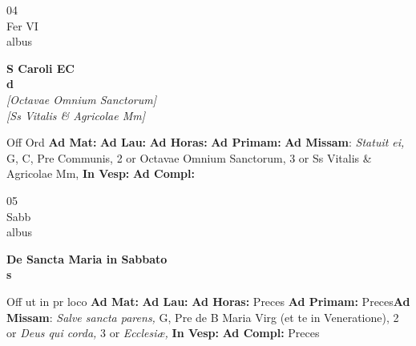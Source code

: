 \documentclass[10pt, openany]{book}
\begin{document}
    \begin{center}
        \begin{minipage}{3.5in}
            \vspace{2em}
            \begin{minipage}{0.5in}
                {\Huge 04} \\
                {\normalsize Fer VI} \\
                {\normalsize albus}
            \end{minipage}
            \begin{minipage}{3.0in}
                \textbf{ \large S Caroli EC \\
                \textnormal{\normalsize d}} \\ \textit{[Octavae Omnium Sanctorum]} \\ \textit{[Ss Vitalis \& Agricolae Mm]} \\ 
            \end{minipage}
            \begin{justify}Off Ord
                \textbf{Ad Mat: }
                \textbf{Ad Lau: }
                \textbf{Ad Horas: }
                \textbf{Ad Primam: }\textbf{Ad Missam}: \textit{Statuit ei,} G, C, Pre Communis, 2 or Octavae Omnium Sanctorum, 3 or Ss Vitalis \& Agricolae Mm,  
                \textbf{In Vesp: }
                \textbf{Ad Compl: }
            \end{justify}
        \end{minipage}
    \end{center}

    \begin{center}
        \begin{minipage}{3.5in}
            \vspace{2em}
            \begin{minipage}{0.5in}
                {\Huge 05} \\
                {\normalsize Sabb} \\
                {\normalsize albus}
            \end{minipage}
            \begin{minipage}{3.0in}
                \textbf{ \large De Sancta Maria in Sabbato \\
                \textnormal{\normalsize s}} \\ 
            \end{minipage}
            \begin{justify}Off ut in pr loco
                \textbf{Ad Mat: }
                \textbf{Ad Lau: }
                \textbf{Ad Horas: }Preces
                \textbf{Ad Primam: }Preces\textbf{Ad Missam}: \textit{Salve sancta parens,} G, Pre de B Maria Virg (et te in Veneratione), 2 or \textit{Deus qui corda,} 3 or \textit{Ecclesiæ,}  
                \textbf{In Vesp: }
                \textbf{Ad Compl: }Preces
            \end{justify}
        \end{minipage}
    \end{center}
\end{document}
